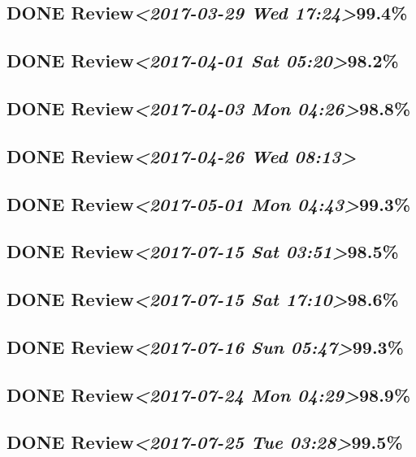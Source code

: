 \documentclass[11pt]{ctexart}
\begin{document}
\subsection{{\bfseries\sffamily DONE} Review\textit{<2017-03-29 Wed 17:24>}99.4\%}
\label{sec:orgb28ea50}
\subsection{{\bfseries\sffamily DONE} Review\textit{<2017-04-01 Sat 05:20>}98.2\%}
\label{sec:org71a781e}
\subsection{{\bfseries\sffamily DONE} Review\textit{<2017-04-03 Mon 04:26>}98.8\%}
\label{sec:org4e542d9}
\subsection{{\bfseries\sffamily DONE} Review\textit{<2017-04-26 Wed 08:13>}}
\label{sec:org26126d8}
\subsection{{\bfseries\sffamily DONE} Review\textit{<2017-05-01 Mon 04:43>}99.3\%}
\label{sec:org472b4c8}
\subsection{{\bfseries\sffamily DONE} Review\textit{<2017-07-15 Sat 03:51>}98.5\%}
\label{sec:org291c2e1}
\subsection{{\bfseries\sffamily DONE} Review\textit{<2017-07-15 Sat 17:10>}98.6\%}
\label{sec:org80a9383}
\subsection{{\bfseries\sffamily DONE} Review\textit{<2017-07-16 Sun 05:47>}99.3\%}
\label{sec:org9327d7c}
\subsection{{\bfseries\sffamily DONE} Review\textit{<2017-07-24 Mon 04:29>}98.9\%}
\label{sec:orgbebfdfe}
\subsection{{\bfseries\sffamily DONE} Review\textit{<2017-07-25 Tue 03:28>}99.5\%}
\label{sec:org255180f}
\end{document}
